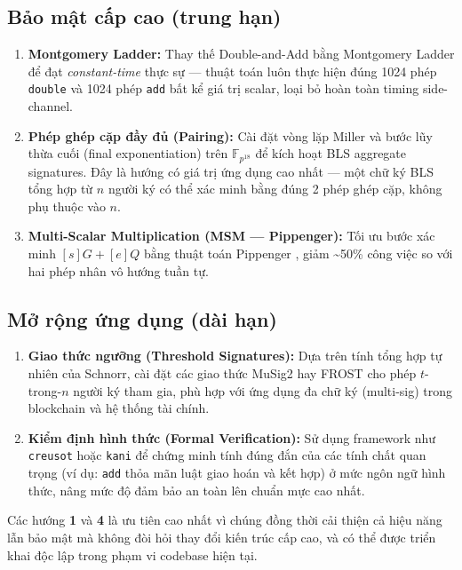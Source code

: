 \subsection{Bảo mật cấp cao (trung
hạn)}\label{bux1ea3o-mux1eadt-cux1ea5p-cao-trung-hux1ea1n}

\begin{enumerate}
\def\labelenumi{\arabic{enumi}.}
\setcounter{enumi}{3}
\item
  \textbf{Montgomery Ladder:} Thay thế Double-and-Add bằng Montgomery
  Ladder để đạt \emph{constant-time} thực sự --- thuật toán luôn thực
  hiện đúng 1024 phép \texttt{double} và 1024 phép \texttt{add} bất kể
  giá trị scalar, loại bỏ hoàn toàn timing side-channel.
\item
  \textbf{Phép ghép cặp đầy đủ (Pairing):} Cài đặt vòng lặp Miller và
  bước lũy thừa cuối (final exponentiation) trên \(\mathbb{F}_{p^{18}}\)
  để kích hoạt BLS aggregate signatures. Đây là hướng có giá trị ứng
  dụng cao nhất --- một chữ ký BLS tổng hợp từ \(n\) người ký có thể xác
  minh bằng đúng 2 phép ghép cặp, không phụ thuộc vào \(n\).
\item
  \textbf{Multi-Scalar Multiplication (MSM --- Pippenger):} Tối ưu bước
  xác minh \([s]G + [e]Q\) bằng thuật toán Pippenger \citep{BLS12_381},
  giảm \textasciitilde50\% công việc so với hai phép nhân vô hướng tuần
  tự.
\end{enumerate}

\subsection{Mở rộng ứng dụng (dài
hạn)}\label{mux1edf-rux1ed9ng-ux1ee9ng-dux1ee5ng-duxe0i-hux1ea1n}

\begin{enumerate}
\def\labelenumi{\arabic{enumi}.}
\setcounter{enumi}{6}
\item
  \textbf{Giao thức ngưỡng (Threshold Signatures):} Dựa trên tính tổng
  hợp tự nhiên của Schnorr, cài đặt các giao thức MuSig2 hay FROST cho
  phép \(t\)-trong-\(n\) người ký tham gia, phù hợp với ứng dụng đa chữ
  ký (multi-sig) trong blockchain và hệ thống tài chính.
\item
  \textbf{Kiểm định hình thức (Formal Verification):} Sử dụng framework
  như \texttt{creusot} hoặc \texttt{kani} để chứng minh tính đúng đắn
  của các tính chất quan trọng (ví dụ: \texttt{add} thỏa mãn luật giao
  hoán và kết hợp) ở mức ngôn ngữ hình thức, nâng mức độ đảm bảo an toàn
  lên chuẩn mực cao nhất.
\end{enumerate}

Các hướng \textbf{1} và \textbf{4} là ưu tiên cao nhất vì chúng đồng
thời cải thiện cả hiệu năng lẫn bảo mật mà không đòi hỏi thay đổi kiến
trúc cấp cao, và có thể được triển khai độc lập trong phạm vi codebase
hiện tại.

\FloatBarrier
